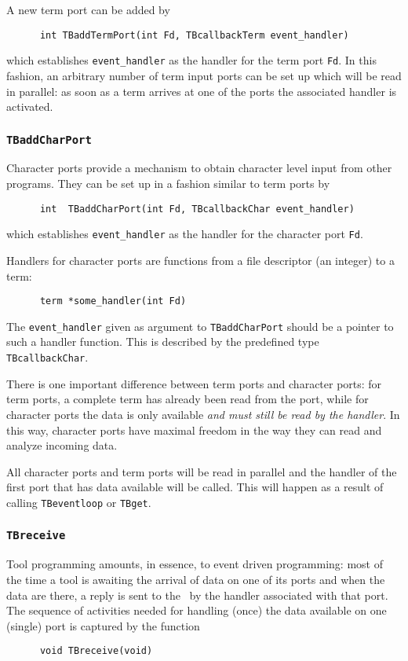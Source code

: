 A new term port can be added by
\begin{verbatim}
      int TBaddTermPort(int Fd, TBcallbackTerm event_handler)
\end{verbatim}
which establishes {\tt event\_handler} as the handler for the term port {\tt Fd}.
In this fashion, an arbitrary number of term input ports can be set up which
will be read in parallel: as soon as a term arrives at one of the ports
the associated handler is activated.

\subsubsection{\label{TBaddCharPort}{\tt TBaddCharPort}}

Character ports provide a mechanism to obtain character level input
from other programs. They can be set up in a fashion similar 
to term ports by
\begin{verbatim}
      int  TBaddCharPort(int Fd, TBcallbackChar event_handler)
\end{verbatim}
which establishes {\tt event\_handler} as the handler for the character port {\tt Fd}.

Handlers for character ports are functions from a file descriptor (an integer)
to a term:
\begin{verbatim}
      term *some_handler(int Fd)
\end{verbatim}
The {\tt event\_handler} given as argument to
{\tt TBaddCharPort} should be a pointer to such a handler function.
This is described by the predefined type {\tt TBcallbackChar}.

There is one important difference between term ports and character ports:
for term ports, a complete term has already been read from the port,
while for character ports the data is only available {\em and must still
be read by the handler}. In this way, character ports have maximal
freedom in the way they can read and analyze incoming data.

All character ports and term ports will be read in parallel
and the handler of the first port that has data available will be called.
This will happen as a result of calling {\tt TBeventloop} or {\tt TBget}.

\subsubsection{\label{TBreceive}{\tt TBreceive}}

Tool programming amounts, in essence, to event driven programming: most of the time
a tool is awaiting the arrival of data on one of its
ports and when the data are there, a reply is sent to the \TB\ by the
handler associated with that port.  The sequence of activities needed for
handling (once) the data available on one (single) port is captured by the function
\begin{verbatim}
      void TBreceive(void)
\end{verbatim}

